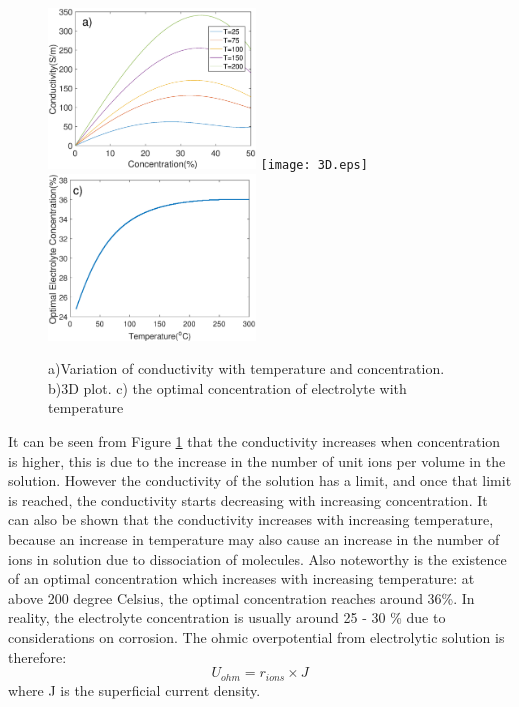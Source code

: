 \documentclass[11pt, a4paper]{article}
\begin{document}
\begin{figure}[h] 
\includegraphics[width=5.5cm] {cond.eps} 
\texttt{[image: 3D.eps]}
\includegraphics[width = 5.5cm]{optimum.eps}
\caption{ a)Variation of conductivity with temperature and concentration. b)3D plot. c) the optimal concentration of electrolyte with temperature} 
\label{fig:3D}
\end{figure} 
It can be seen from Figure \ref{fig:3D} that the conductivity increases when concentration is higher, this is due to the increase in the number of unit ions per volume in the solution. However the conductivity of the solution has a limit, and once that limit is reached, the conductivity starts decreasing with increasing concentration. It can also be shown that the conductivity increases with increasing temperature, because an increase in temperature may also cause an increase in the number of ions in solution due to dissociation of molecules. Also noteworthy is the existence of an optimal concentration which increases with increasing temperature: at above 200 degree Celsius, the optimal concentration reaches around 36\%. In reality, the electrolyte concentration is usually around 25 - 30 \% due to considerations on corrosion.
The ohmic overpotential from electrolytic solution is therefore:\
\begin{equation} 
U_{ohm} = r_{ions} \times J
\end{equation} 
where J is the superficial current density. 


\end{document}
